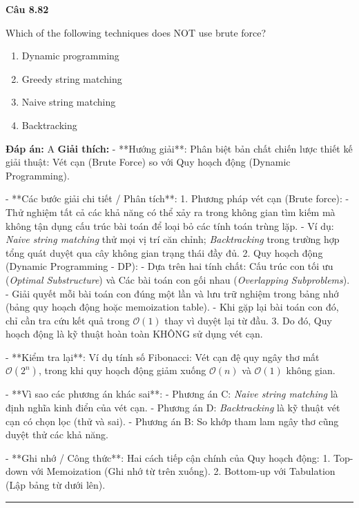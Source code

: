 \documentclass[11pt,a4paper]{article}
\newenvironment{question}[1]{%
  \par\vspace{1em}\noindent\textbf{\large Câu #1}\par\vspace{0.4em}
}{%
  \par\vspace{1em}\hrule\vspace{0.6em}
}
\newenvironment{choices}{%
  \begin{enumerate}[label=\textbf{\Alph*.},leftmargin=2.2em,itemsep=2pt,topsep=3pt]
}{%
  \end{enumerate}
}
\newcommand{\choice}{\item}
\begin{document}
\begin{question}{8.82}
Which of the following techniques does NOT use brute force?
\begin{choices}
\choice Dynamic programming
\choice Greedy string matching
\choice Naive string matching
\choice Backtracking
\end{choices}
\textbf{Đáp án:} A
\textbf{Giải thích:} - **Hướng giải**:
Phân biệt bản chất chiến lược thiết kế giải thuật: Vét cạn (Brute Force) so với Quy hoạch động (Dynamic Programming).


- **Các bước giải chi tiết / Phân tích**:
1. Phương pháp vét cạn (Brute force):
   - Thử nghiệm tất cả các khả năng có thể xảy ra trong không gian tìm kiếm mà không tận dụng cấu trúc bài toán để loại bỏ các tính toán trùng lặp.
   - Ví dụ: \textit{Naive string matching} thử mọi vị trí căn chỉnh; \textit{Backtracking} trong trường hợp tổng quát duyệt qua cây không gian trạng thái đầy đủ.
2. Quy hoạch động (Dynamic Programming - DP):
   - Dựa trên hai tính chất: Cấu trúc con tối ưu (\textit{Optimal Substructure}) và Các bài toán con gối nhau (\textit{Overlapping Subproblems}).
   - Giải quyết mỗi bài toán con đúng một lần và lưu trữ nghiệm trong bảng nhớ (bảng quy hoạch động hoặc memoization table).
   - Khi gặp lại bài toán con đó, chỉ cần tra cứu kết quả trong \(\mathcal{O}(1)\) thay vì duyệt lại từ đầu.
3. Do đó, Quy hoạch động là kỹ thuật hoàn toàn KHÔNG sử dụng vét cạn.


- **Kiểm tra lại**:
Ví dụ tính số Fibonacci: Vét cạn đệ quy ngây thơ mất \(\mathcal{O}(2^n)\), trong khi quy hoạch động giảm xuống \(\mathcal{O}(n)\) và \(\mathcal{O}(1)\) không gian.


- **Vì sao các phương án khác sai**:
- Phương án C: \textit{Naive string matching} là định nghĩa kinh điển của vét cạn.
- Phương án D: \textit{Backtracking} là kỹ thuật vét cạn có chọn lọc (thử và sai).
- Phương án B: So khớp tham lam ngây thơ cũng duyệt thử các khả năng.


- **Ghi nhớ / Công thức**:
Hai cách tiếp cận chính của Quy hoạch động:
1. Top-down với Memoization (Ghi nhớ từ trên xuống).
2. Bottom-up với Tabulation (Lập bảng từ dưới lên).
\end{question}
\end{document}

